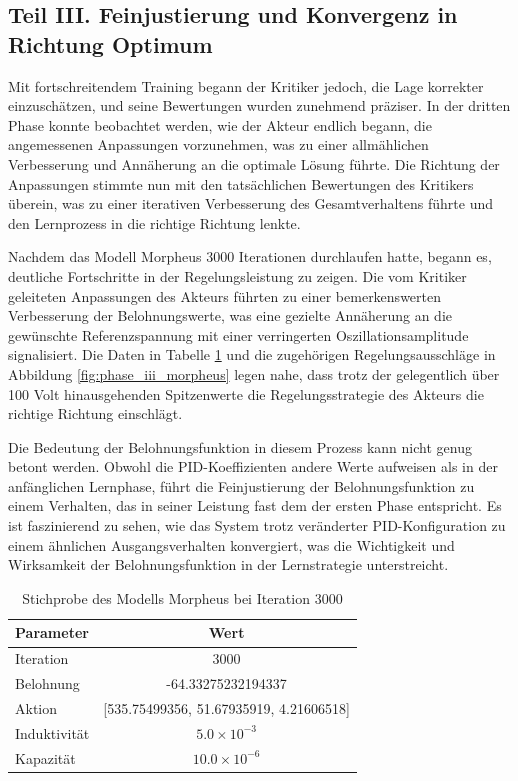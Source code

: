 
\subsection{Teil III. Feinjustierung und Konvergenz in Richtung Optimum}
\label{subsec:Fine_Tuning_and_Convergence_Towards_Optimum}

Mit fortschreitendem Training begann der Kritiker jedoch, die Lage korrekter einzuschätzen, und seine Bewertungen wurden zunehmend präziser. In der dritten Phase konnte beobachtet werden, wie der Akteur endlich begann, die angemessenen Anpassungen vorzunehmen, was zu einer allmählichen Verbesserung und Annäherung an die optimale Lösung führte. Die Richtung der Anpassungen stimmte nun mit den tatsächlichen Bewertungen des Kritikers überein, was zu einer iterativen Verbesserung des Gesamtverhaltens führte und den Lernprozess in die richtige Richtung lenkte.


Nachdem das Modell Morpheus 3000 Iterationen durchlaufen hatte, begann es, deutliche Fortschritte in der Regelungsleistung zu zeigen. Die vom Kritiker geleiteten Anpassungen des Akteurs führten zu einer bemerkenswerten Verbesserung der Belohnungswerte, was eine gezielte Annäherung an die gewünschte Referenzspannung mit einer verringerten Oszillationsamplitude signalisiert. Die Daten in Tabelle \ref{tab:sample_morpheus_3000} und die zugehörigen Regelungsausschläge in Abbildung \ref{fig:phase_iii_morpheus} legen nahe, dass trotz der gelegentlich über 100 Volt hinausgehenden Spitzenwerte die Regelungsstrategie des Akteurs die richtige Richtung einschlägt.

Die Bedeutung der Belohnungsfunktion in diesem Prozess kann nicht genug betont werden. Obwohl die PID-Koeffizienten andere Werte aufweisen als in der anfänglichen Lernphase, führt die Feinjustierung der Belohnungsfunktion zu einem Verhalten, das in seiner Leistung fast dem der ersten Phase entspricht. Es ist faszinierend zu sehen, wie das System trotz veränderter PID-Konfiguration zu einem ähnlichen Ausgangsverhalten konvergiert, was die Wichtigkeit und Wirksamkeit der Belohnungsfunktion in der Lernstrategie unterstreicht.

\begin{table}[htbp]
\centering
\caption{Stichprobe des Modells Morpheus bei Iteration 3000}
\label{tab:sample_morpheus_3000}
\begin{tabular}{l c}
\hline
\textbf{Parameter} & \textbf{Wert} \\
\hline
Iteration & 3000 \\
Belohnung & -64.33275232194337 \\
Aktion & [535.75499356, 51.67935919, 4.21606518] \\
Induktivität & \( 5.0 \times 10^{-3} \) \\
Kapazität & \( 10.0 \times 10^{-6} \) \\
\hline
\end{tabular}
\end{table}


